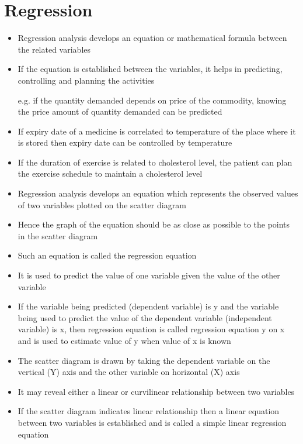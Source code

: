 \documentclass[
10pt, %
a4paper, %
]{report}
\begin{document}
\section{Regression}
\begin{itemize}
\item Regression analysis develops an equation or mathematical formula between the related variables
\item If the equation is established between the variables, it helps in predicting, controlling and planning the activities
\item[e.g.] if the quantity demanded depends on price of the commodity, knowing the price amount of quantity demanded can be predicted
\item If expiry date of a medicine is correlated to temperature of the place where it is stored then expiry date can be controlled by temperature
\item If the duration of exercise is related to cholesterol level, the patient can plan the exercise schedule to maintain a cholesterol level
\item Regression analysis develops an equation which represents the observed values of two variables plotted on the scatter diagram
\item Hence the graph of the equation should be as close as possible to the points in the scatter diagram
\item Such an equation is called the regression equation
\item It is used to predict the value of one variable given the value of the other variable
\item If the variable being predicted (dependent variable) is y and the variable being used to predict the value of the dependent variable (independent variable) is x, then regression equation is called regression equation y on x and is used to estimate value of y when value of x is known
\item The scatter diagram is drawn by taking the dependent variable on the vertical (Y) axis and the other variable on horizontal (X) axis
\item It may reveal either a linear or curvilinear relationship between two variables
\item If the scatter diagram indicates linear relationship then a linear equation between two variables is established and is called a simple linear regression equation
\end{itemize}
\end{document}
